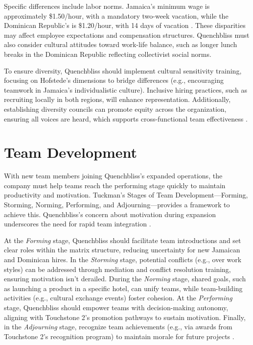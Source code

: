 \documentclass[12pt]{article}
\begin{document}
Specific differences include labor norms. Jamaica’s minimum wage is approximately \$1.50/hour, with a mandatory two-week vacation, while the Dominican Republic’s is \$1.20/hour, with 14 days of vacation \citep{worldbank2025}. These disparities may affect employee expectations and compensation structures. Quenchbliss must also consider cultural attitudes toward work-life balance, such as longer lunch breaks in the Dominican Republic reflecting collectivist social norms.

To ensure diversity, Quenchbliss should implement cultural sensitivity training, focusing on Hofstede’s dimensions to bridge differences (e.g., encouraging teamwork in Jamaica’s individualistic culture). Inclusive hiring practices, such as recruiting locally in both regions, will enhance representation. Additionally, establishing diversity councils can promote equity across the organization, ensuring all voices are heard, which supports cross-functional team effectiveness \citep{sophia_culture}.

\section{Team Development}
With new team members joining Quenchbliss’s expanded operations, the company must help teams reach the performing stage quickly to maintain productivity and motivation. Tuckman’s Stages of Team Development—Forming, Storming, Norming, Performing, and Adjourning—provides a framework to achieve this. Quenchbliss’s concern about motivation during expansion underscores the need for rapid team integration \citep{sophia_team}.

At the \textit{Forming} stage, Quenchbliss should facilitate team introductions and set clear roles within the matrix structure, reducing uncertainty for new Jamaican and Dominican hires. In the \textit{Storming} stage, potential conflicts (e.g., over work styles) can be addressed through mediation and conflict resolution training, ensuring motivation isn’t derailed. During the \textit{Norming} stage, shared goals, such as launching a product in a specific hotel, can unify teams, while team-building activities (e.g., cultural exchange events) foster cohesion. At the \textit{Performing} stage, Quenchbliss should empower teams with decision-making autonomy, aligning with Touchstone 2’s promotion pathways to sustain motivation. Finally, in the \textit{Adjourning} stage, recognize team achievements (e.g., via awards from Touchstone 2’s recognition program) to maintain morale for future projects \citep{sophia_team}.
\end{document}
